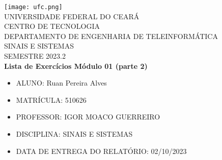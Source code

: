 

\usepackage{listings}
\usepackage{amsmath,amssymb,caption}
\newcommand{\tarc}{\mbox{\large$\frown$}}
\newcommand{\arc}[1]{\stackrel{\tarc}{#1}}




\clearpage
\thispagestyle{empty}

\begin{bfseries}
\begin{center}

\texttt{[image: ufc.png]} \\
\vspace{-4pt} 
UNIVERSIDADE FEDERAL DO CEARÁ \\
\vspace{4pt} 
CENTRO DE TECNOLOGIA \\
\vspace{4pt} 
DEPARTAMENTO DE ENGENHARIA DE TELEINFORMÁTICA \\
\vspace{4pt}
SINAIS E SISTEMAS \\
\vspace{4pt}
SEMESTRE 2023.2 \\


\vspace*{\fill}
\textbf{Lista de Exercícios Módulo 01 (parte 2)}
\vspace*{\fill}

\end{center}

\begin{itemize}[leftmargin=*]
    \setlength{\itemsep}{0pt}
    \item[] ALUNO: Ruan Pereira Alves
    \item[] MATRÍCULA: 510626
    \item[] PROFESSOR: IGOR MOACO GUERREIRO
    \item[] DISCIPLINA: SINAIS E SISTEMAS
    \item[] DATA DE ENTREGA DO RELATÓRIO: 02/10/2023
\end{itemize}

\end{bfseries}

